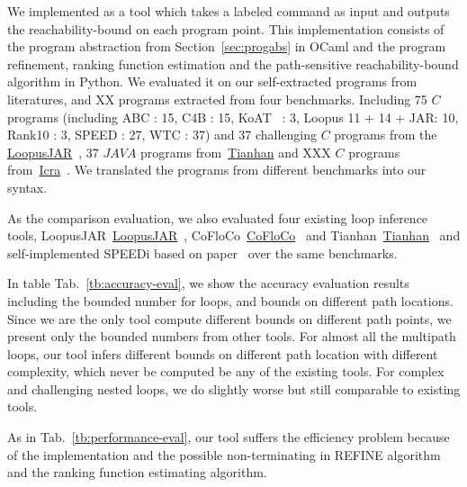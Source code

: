 We implemented {\THESYSTEM} as a tool which takes a labeled command as input  
and outputs the reachability-bound on each program point.
This implementation consists of the 
program abstraction from Section~\ref{sec:progabs} in OCaml and the program refinement, ranking function estimation and the path-sensitive reachability-bound algorithm in Python.
We evaluated it on our self-extracted programs from literatures, and XX programs extracted from four benchmarks. 
Including 75 $C$ programs (including ABC : 15, C4B : 15, KoAT~\cite{BrockschmidtEFFG14,FalkeKS12,FalkeKS11} : 3, Loopus 11 + 14 + JAR: 10, Rank10 : 3, SPEED : 27, WTC : 37) and 37 challenging $C$ programs 
from the \hyperlink{https://forsyte.at/static/people/sinn/loopusJAR/index.html}{LoopusJAR}~\cite{SinnZV17},
37 $JAVA$ programs from~\hyperlink{https://zenodo.org/record/5140586\#.Y5pBoC-B1QI}{Tianhan}\cite{LuCT21}
and XXX $C$ programs from~\hyperlink{https://github.com/icra-team/icra}{Icra}~\cite{KincaidBCR19,CyphertBKR19}.
We translated the programs from different benchmarks into our syntax.

As the comparison evaluation, we also evaluated four existing loop inference tools, 
LoopusJAR~\hyperlink{https://forsyte.at/software/loopus/}{LoopusJAR}~\cite{SinnZV17},
CoFloCo~\hyperlink{https://github.com/aeflores/CoFloCo/tree/master/src}{CoFloCo}~\cite{Montoya17,Flores-Montoya16,Flores-MontoyaH14}
and Tianhan~\hyperlink{https://zenodo.org/record/5140586\#.Y5pBoC-B1QI}{Tianhan}~\cite{LuCT21}
and self-implemented SPEEDi based on paper~\cite{GulwaniJK09}
over the same benchmarks.

In table Tab.~\ref{tb:accuracy-eval}, we show the accuracy evaluation results including the bounded number for loops, and bounds on different path locations.
Since we are the only tool compute different bounds on different path points, we present only the bounded numbers from other tools. For almost all the multipath loops, our tool infers different bounds on different path location with different complexity, which never be computed be any of the existing tools.
For complex and challenging nested loops, we do slightly worse but still comparable to existing tools.

As in Tab.~\ref{tb:performance-eval}, our tool suffers the efficiency problem because of the implementation and the possible non-terminating in REFINE algorithm and the ranking function estimating algorithm.


